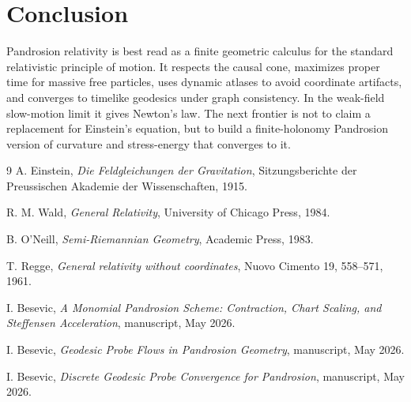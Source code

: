 \documentclass[11pt]{article}
\begin{document}
\section{Conclusion}

Pandrosion relativity is best read as a finite geometric calculus for the
standard relativistic principle of motion.  It respects the causal cone,
maximizes proper time for massive free particles, uses dynamic atlases to avoid
coordinate artifacts, and converges to timelike geodesics under graph
consistency.  In the weak-field slow-motion limit it gives Newton's law.  The
next frontier is not to claim a replacement for Einstein's equation, but to
build a finite-holonomy Pandrosion version of curvature and stress-energy that
converges to it.

\begin{thebibliography}{9}
A. Einstein, \emph{Die Feldgleichungen der Gravitation}, Sitzungsberichte der
Preussischen Akademie der Wissenschaften, 1915.

R. M. Wald, \emph{General Relativity}, University of Chicago Press, 1984.

B. O'Neill, \emph{Semi-Riemannian Geometry}, Academic Press, 1983.

T. Regge, \emph{General relativity without coordinates}, Nuovo Cimento 19,
558--571, 1961.

I. Besevic, \emph{A Monomial Pandrosion Scheme: Contraction, Chart Scaling, and
Steffensen Acceleration}, manuscript, May 2026.

I. Besevic, \emph{Geodesic Probe Flows in Pandrosion Geometry}, manuscript,
May 2026.

I. Besevic, \emph{Discrete Geodesic Probe Convergence for Pandrosion},
manuscript, May 2026.
\end{thebibliography}
\end{document}
